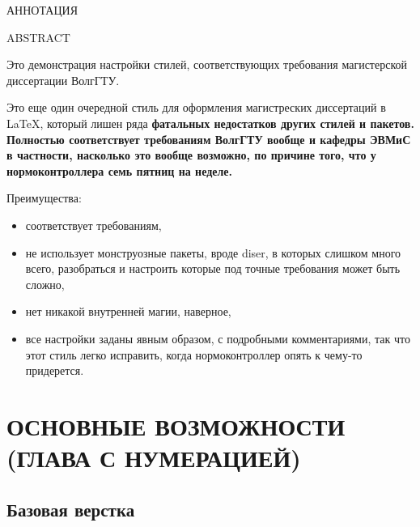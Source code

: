 


\begin{center}
	АННОТАЦИЯ
\end{center}

\begin{center}
	ABSTRACT
\end{center}

\tableofcontents
{}
\aftertitle

Это демонстрация настройки стилей, соответствующих требования магистерской диссертации ВолгГТУ. 

Это еще один очередной стиль для оформления магистреских диссертаций в \LaTeX, который лишен ряда \bf фатальных
недостатков \nf других стилей и пакетов. Полностью соответствует требованиям ВолгГТУ вообще и кафедры ЭВМиС в
частности, насколько это вообще возможно, по причине того, что у нормоконтроллера семь пятниц на неделе. 

Преимущества:
\begin{itemize}
	\item соответствует требованиям,
	\item не использует монструозные пакеты, вроде diser, в которых слишком много всего,
	      разобраться и настроить которые под точные требования может быть сложно,
	\item нет никакой внутренней магии, наверное, 
	\item все настройки заданы явным образом, с подробными комментариями, так что этот
	      стиль легко исправить, когда нормоконтроллер опять к чему-то придерется.
\end{itemize}


\chapter{ОСНОВНЫЕ ВОЗМОЖНОСТИ (ГЛАВА С НУМЕРАЦИЕЙ)}
\section{Базовая верстка}
\aftertitle

